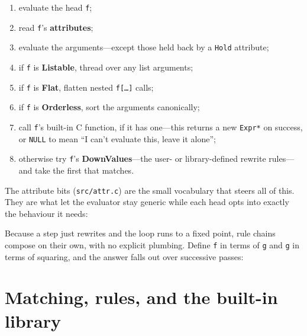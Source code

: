 \begin{enumerate}
  \item evaluate the head \texttt{f};
  \item read \texttt{f}'s \textbf{attributes};
  \item evaluate the arguments---except those held back by a \texttt{Hold} attribute;
  \item if \texttt{f} is \textbf{Listable}, thread over any list arguments;
  \item if \texttt{f} is \textbf{Flat}, flatten nested \texttt{f[\dots]} calls;
  \item if \texttt{f} is \textbf{Orderless}, sort the arguments canonically;
  \item call \texttt{f}'s built-in C function, if it has one---this returns a new
        \texttt{Expr*} on success, or \texttt{NULL} to mean ``I can't evaluate this,
        leave it alone'';
  \item otherwise try \texttt{f}'s \textbf{DownValues}---the user- or library-defined
        rewrite rules---and take the first that matches.
\end{enumerate}

The attribute bits (\texttt{src/attr.c}) are the small vocabulary that steers all of
this. They are what let the evaluator stay generic while each head opts into exactly
the behaviour it needs:


Because a step just rewrites and the loop runs to a fixed point, rule chains compose
on their own, with no explicit plumbing. Define \texttt{f} in terms of \texttt{g} and
\texttt{g} in terms of squaring, and the answer falls out over successive passes:


\section{Matching, rules, and the built-in library}
\label{app:match}


